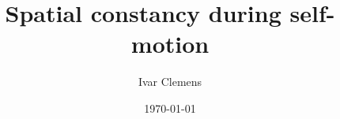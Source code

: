 \documentclass[10pt,a5paper,onecolumn]{book}
\begin{document}
\frontmatter
\title{Spatial constancy during self-motion}
\author{Ivar Clemens}
\date{\today}
\maketitle
\tableofcontents

\mainmatter




{}

\end{document}
